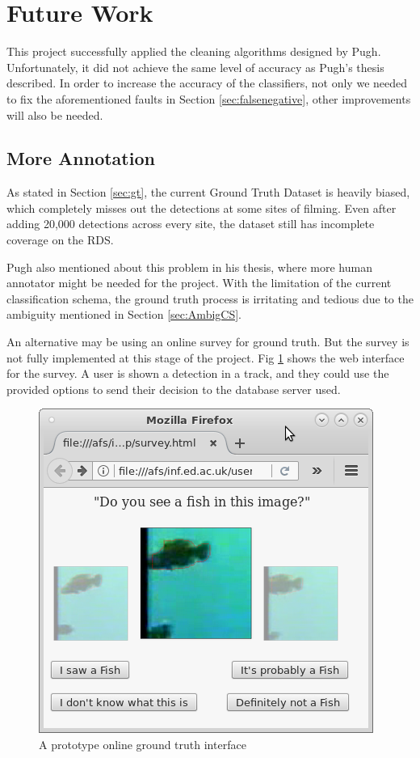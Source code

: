 \documentclass[bsc,frontabs,twoside,fullspacing,parskip,deptreport]{infthesis}
\begin{document}
\section{Future Work}
\label{sec:future}

This project successfully applied the cleaning algorithms designed by Pugh\cite{Pugh}. 
Unfortunately, it did not achieve the same level of accuracy as Pugh's thesis described.
In order to increase the accuracy of the classifiers, not only we needed to fix the aforementioned faults in Section \ref{sec:falsenegative}, other improvements will also be needed.

\subsection{More Annotation}

As stated in Section \ref{sec:gt}, the current Ground Truth Dataset is heavily biased, which completely misses out the detections at some sites of filming. 
Even after adding 20,000 detections across every site, the dataset still has incomplete coverage on the RDS. 

Pugh also mentioned about this problem in his thesis, where more human annotator might be needed for the project.
With the limitation of the current classification schema, the ground truth process is irritating and tedious due to the ambiguity mentioned in Section \ref{sec:AmbigCS}.

An alternative may be using an online survey for ground truth. 
But the survey is not fully implemented at this stage of the project. 
Fig \ref{fig:gto} shows the web interface for the survey.
A user is shown a detection in a track, and they could use the provided options to send their decision to the database server used.

\begin{figure}[!h]
    \centering
    \includegraphics[scale=0.5]{graph/query.png}
    \caption{A prototype online ground truth interface}
    \label{fig:gto}
\end{figure}
\end{document}
